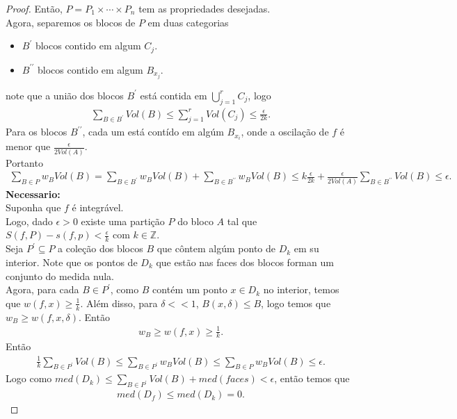 \begin{proof}
  Então, $P=P_1\times\cdots\times P_n$ tem as propriedades desejadas.\\
  Agora, separemos os blocos de $P$ em duas categorias
  \begin{itemize}
    \item $B^{\prime}$ blocos contido em algum $C_j$.
    \item $B^{\prime\prime}$ blocos contido em algum $B_{x_j}$. 
  \end{itemize}
  note que a união dos blocos $B^{\prime}$ está contida em $\bigcup_{j=1}^{r}C_j$, logo
  \begin{align*}
    \sum_{B\in B^{\prime}}Vol(B)\leq \sum_{j=1}^{r}Vol(C_j)\leq\frac{\epsilon}{2k}.
  \end{align*}
  Para os blocos $B^{\prime\prime}$, cada um está contído em algúm $B_{x_i}$, onde a oscilação de $f$ é menor que $\frac{\epsilon}{2 Vol(A)}$.\\
  Portanto
  \begin{align*}
    \sum_{B\in P}w_BVol(B)=\sum_{B\in B^{\prime}}w_BVol(B)+\sum_{B\in B^{\prime\prime}}w_BVol(B)\leq k\frac{\epsilon}{2k}+\frac{\epsilon}{2Vol(A)}\sum_{B\in B^{\prime\prime}}Vol(B)\leq \epsilon.
  \end{align*}
\textbf{Necessario:}\\
  Suponha que $f$ é integrável.\\
  Logo, dado $\epsilon>0$ existe uma partição $P$ do bloco $A$ tal que $S(f,P)-s(f,p)<\frac{\epsilon}{k}$ com $k\in\mathbb{Z}$.\\
  Seja $P^{\prime}\subseteq P$ a coleção dos blocos $B$ que côntem algúm ponto de $D_k$ em su interior. Note que os pontos de $D_k$ que estão nas faces dos blocos forman um conjunto do medida nula.\\
  Agora, para cada $B\in P^{\prime}$, como $B$ contém um ponto $x\in D_k$ no interior, temos que $w(f,x)\geq \frac{1}{k}$. Além disso, para $\delta<<1$, $B(x,\delta)\leq B$, logo temos que $w_{B}\geq w(f,x,\delta)$. Então
  \begin{align*}
    w_B\geq w(f,x)\geq \frac{1}{k}.
  \end{align*}
  Então
  \begin{align*}
    \frac{1}{k}\sum_{B\in P^{\prime}}Vol(B)\leq \sum_{B\in P^{\prime}}w_BVol(B)\leq \sum_{B\in P}w_BVol(B)\leq \epsilon.
  \end{align*}
  Logo como $med(D_k)\leq \sum_{B\in P^{\prime}}Vol(B)+med(faces)<\epsilon$, então temos que
  \begin{align*}
    med(D_f)\leq med(D_k)=0.
  \end{align*}
\end{proof}
